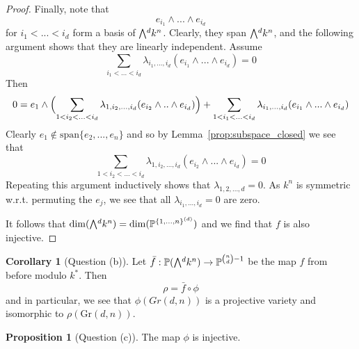 \documentclass{scrartcl}
\newcommand{\Proj}{\mathbb{P}}
\newcommand{\Gr}{\mathrm{Gr}}
\newcommand{\extpow}{\mathchoice{{\textstyle\bigwedge}}
    {{\bigwedge}}
    {{\textstyle\wedge}}
    {{\scriptstyle\wedge}}}
\newcommand{\vspan}{\mathrm{span}}
\theoremstyle{definition}
\newtheorem{proposition}[subsection]{Proposition}
\newtheorem{corollary}[subsection]{Corollary}
\begin{document}
\begin{proof}
    Finally, note that
    \begin{equation*}
        e_{i_1} \wedge ... \wedge e_{i_d}
    \end{equation*}
    for $i_1 < ... < i_d$ form a basis of $\extpow^d k^n$.
    Clearly, they span $\extpow^d k^n$, and the following argument shows that they are linearly independent.
    Assume
    \begin{equation*}
        \sum_{i_1 < ... < i_d} \lambda_{i_1, ..., i_d} (e_{i_1} \wedge ... \wedge e_{i_d}) = 0
    \end{equation*}
    Then
    \begin{equation*}
        0 = e_1 \wedge \Bigl( \sum_{1 < i_2 < ... < i_d} \lambda_{1, i_2, ..., i_d} (e_{i_2} \wedge .. \wedge e_{i_d}) \Bigr) + \sum_{1 < i_1 < ... < i_d} \lambda_{i_1, ..., i_d} (e_{i_1} \wedge ... \wedge e_{i_d} )
    \end{equation*}
    Clearly $e_1 \notin \vspan\{e_2, ..., e_n\}$ and so by Lemma~\ref{prop:subspace_closed} we see that
    \begin{equation*}
        \sum_{1 < i_2 < ... < i_d} \lambda_{1, i_2, ..., i_d} (e_{i_2} \wedge ... \wedge e_{i_d}) = 0
    \end{equation*}
    Repeating this argument inductively shows that $\lambda_{1, 2, ..., d} = 0$.
    As $k^n$ is symmetric w.r.t. permuting the $e_j$, we see that all $\lambda_{i_1, ..., i_d} = 0$ are zero.

    It follows that $\dim(\extpow^d k^n) = \dim(\Proj^{\{1, ..., n\}^{(d)}})$ and we find that $f$ is also injective.
\end{proof}
\begin{corollary}[Question (b)]
    \label{prop:image_phi}
    Let $\bar{f}: \Proj(\extpow^d k^n) \to \Proj^{{n \choose d} - 1}$ be the map $f$ from before modulo $k^*$.
    Then
    \begin{equation*}
        \rho = \bar{f} \circ \phi
    \end{equation*}
    and in particular, we see that $\phi(Gr(d, n))$ is a projective variety and isomorphic to $\rho(\Gr(d, n))$.
\end{corollary}
\begin{proposition}[Question (c)]
    The map $\phi$ is injective.
\end{proposition}
\end{document}
